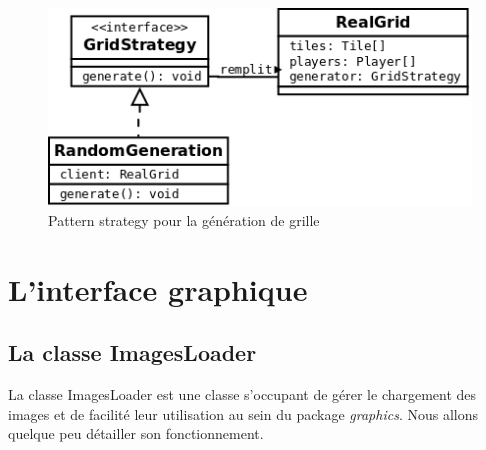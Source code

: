 \documentclass[a4paper,12pt]{article} %
\begin{document}
\begin{figure}[!h]
\centering
\includegraphics[scale=0.5]{images/strategy.png}
\caption{Pattern strategy pour la génération de grille}
\end{figure}


\section{L'interface graphique}
\subsection{La classe ImagesLoader}
La classe ImagesLoader est une classe s’occupant de gérer le chargement des images et de facilité leur utilisation au sein du package \textit{graphics}. Nous allons quelque peu détailler son fonctionnement.
\end{document}
